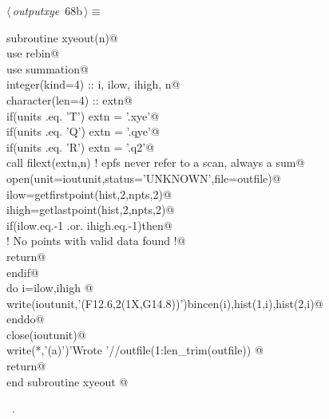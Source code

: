 \documentclass[10pt,a4paper,notitlepage]{article}
\begin{document}
\begin{flushleft} \small
\begin{minipage}{\linewidth}\label{scrap73}\raggedright\small
{} $\langle\,${\it outputxye}\nobreak\ {\footnotesize {68b}}$\,\rangle\equiv$
\vspace{-1ex}
\begin{list}{}{} \item
\mbox{}\verb@      subroutine xyeout(n)@\\
\mbox{}\verb@      use rebin@\\
\mbox{}\verb@      use summation@\\
\mbox{}\verb@      integer(kind=4) :: i, ilow, ihigh, n@\\
\mbox{}\verb@      character(len=4) :: extn@\\
\mbox{}\verb@      if(units .eq. 'T') extn = '.xye'@\\
\mbox{}\verb@      if(units .eq. 'Q') extn = '.qye'@\\
\mbox{}\verb@      if(units .eq. 'R') extn = '.q2'@\\
\mbox{}\verb@      call filext(extn,n) ! epfs never refer to a scan, always a sum@\\
\mbox{}\verb@      open(unit=ioutunit,status='UNKNOWN',file=outfile)@\\
\mbox{}\verb@      ilow=getfirstpoint(hist,2,npts,2)@\\
\mbox{}\verb@      ihigh=getlastpoint(hist,2,npts,2)@\\
\mbox{}\verb@      if(ilow.eq.-1 .or. ihigh.eq.-1)then@\\
\mbox{}\verb@       ! No points with valid data found !@\\
\mbox{}\verb@       return@\\
\mbox{}\verb@      endif@\\
\mbox{}\verb@      do i=ilow,ihigh     @\\
\mbox{}\verb@        write(ioutunit,'(F12.6,2(1X,G14.8))')bincen(i),hist(1,i),hist(2,i)@\\
\mbox{}\verb@      enddo@\\
\mbox{}\verb@      close(ioutunit)@\\
\mbox{}\verb@      write(*,'(a)')'Wrote '//outfile(1:len_trim(outfile))      @\\
\mbox{}\verb@      return@\\
\mbox{}\verb@      end subroutine xyeout                                               @{\NWsep}
\end{list}
\vspace{-1.5ex}
\footnotesize
\begin{list}{}{\setlength{\itemsep}{-\parsep}\setlength{\itemindent}{-\leftmargin}}
\item \NWtxtMacroRefIn\ .

\item{}
\end{list}
\end{minipage}\vspace{4ex}
\end{flushleft}
\end{document}
